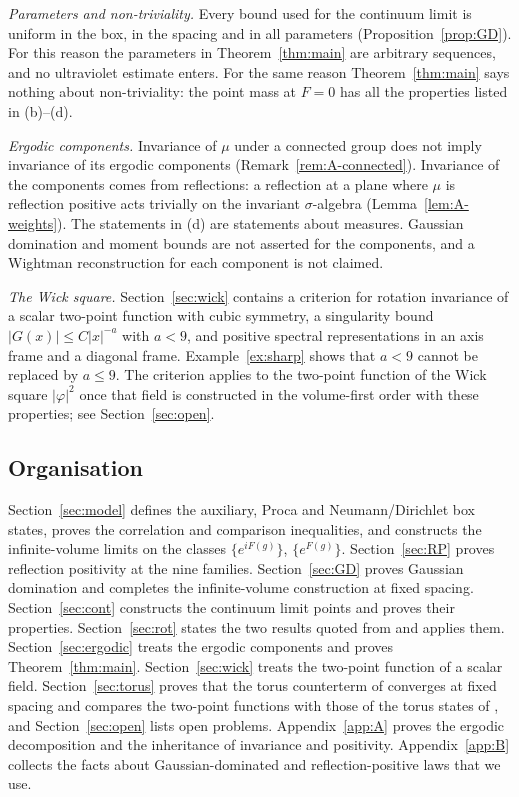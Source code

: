 \documentclass[11pt]{amsart}
\theoremstyle{plain}
\theoremstyle{definition}
\theoremstyle{remark}
\numberwithin{equation}{section}
\newcommand{\abs}[1]{\lvert #1\rvert}
\begin{document}
\emph{Parameters and non-triviality.} Every bound used for the continuum limit is uniform in the box, in the spacing and in all parameters (Proposition~\ref{prop:GD}). For this reason the parameters in Theorem~\ref{thm:main} are arbitrary sequences, and no ultraviolet estimate enters. For the same reason Theorem~\ref{thm:main} says nothing about non-triviality: the point mass at $F=0$ has all the properties listed in (b)--(d).

\emph{Ergodic components.} Invariance of $\mu$ under a connected group does not imply invariance of its ergodic components (Remark~\ref{rem:A-connected}). Invariance of the components comes from reflections: a reflection at a plane where $\mu$ is reflection positive acts trivially on the invariant $\sigma$-algebra (Lemma~\ref{lem:A-weights}). The statements in (d) are statements about measures. Gaussian domination and moment bounds are not asserted for the components, and a Wightman reconstruction for each component is not claimed.

\emph{The Wick square.} Section~\ref{sec:wick} contains a criterion for rotation invariance of a scalar two-point function with cubic symmetry, a singularity bound $\abs{G(x)}\le C\abs{x}^{-a}$ with $a<9$, and positive spectral representations in an axis frame and a diagonal frame. Example~\ref{ex:sharp} shows that $a<9$ cannot be replaced by $a\le9$. The criterion applies to the two-point function of the Wick square $\abs{\varphi}^2$ once that field is constructed in the volume-first order with these properties; see Section~\ref{sec:open}.

\subsection{Organisation}
Section~\ref{sec:model} defines the auxiliary, Proca and Neumann/Dirichlet box states, proves the correlation and comparison inequalities, and constructs the infinite-volume limits on the classes $\{e^{iF(g)}\}$, $\{e^{F(g)}\}$. Section~\ref{sec:RP} proves reflection positivity at the nine families. Section~\ref{sec:GD} proves Gaussian domination and completes the infinite-volume construction at fixed spacing. Section~\ref{sec:cont} constructs the continuum limit points and proves their properties. Section~\ref{sec:rot} states the two results quoted from \cite{S} and applies them. Section~\ref{sec:ergodic} treats the ergodic components and proves Theorem~\ref{thm:main}. Section~\ref{sec:wick} treats the two-point function of a scalar field. Section~\ref{sec:torus} proves that the torus counterterm of \cite{v1} converges at fixed spacing and compares the two-point functions with those of the torus states of \cite{v1}, and Section~\ref{sec:open} lists open problems. Appendix~\ref{app:A} proves the ergodic decomposition and the inheritance of invariance and positivity. Appendix~\ref{app:B} collects the facts about Gaussian-dominated and reflection-positive laws that we use.
\end{document}
